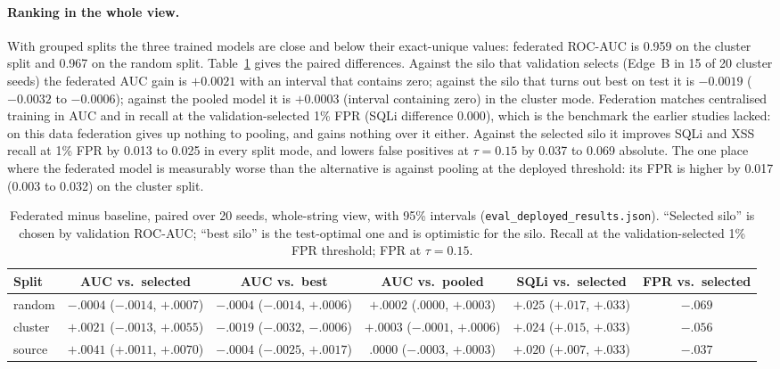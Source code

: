 \paragraph{Ranking in the whole view.}
With grouped splits the three trained models are close and below their exact-unique values: federated ROC-AUC is 0.959 on the cluster split and 0.967 on the random split. Table~\ref{tab:eval-paired} gives the paired differences. Against the silo that validation selects (Edge~B in 15 of 20 cluster seeds) the federated AUC gain is $+0.0021$ with an interval that contains zero; against the silo that turns out best on test it is $-0.0019$ ($-0.0032$ to $-0.0006$); against the pooled model it is $+0.0003$ (interval containing zero) in the cluster mode. Federation matches centralised training in AUC and in recall at the validation-selected 1\% FPR (SQLi difference $0.000$), which is the benchmark the earlier studies lacked: on this data federation gives up nothing to pooling, and gains nothing over it either. Against the selected silo it improves SQLi and XSS recall at 1\% FPR by 0.013 to 0.025 in every split mode, and lowers false positives at $\tau=0.15$ by 0.037 to 0.069 absolute. The one place where the federated model is measurably worse than the alternative is against pooling at the deployed threshold: its FPR is higher by 0.017 (0.003 to 0.032) on the cluster split.

\begin{table}[t]
\centering
\caption{Federated minus baseline, paired over 20 seeds, whole-string view, with 95\% intervals (\texttt{eval\_deployed\_results.json}). ``Selected silo'' is chosen by validation ROC-AUC; ``best silo'' is the test-optimal one and is optimistic for the silo. Recall at the validation-selected 1\% FPR threshold; FPR at $\tau=0.15$.}
\label{tab:eval-paired}
\begin{tabular}{@{}lccccc@{}}
\toprule
\textbf{Split} & \textbf{AUC vs.\ selected} & \textbf{AUC vs.\ best} & \textbf{AUC vs.\ pooled} & \textbf{SQLi vs.\ selected} & \textbf{FPR vs.\ selected} \\ \midrule
random & $-.0004$ ($-.0014$, $+.0007$) & $-.0004$ ($-.0014$, $+.0006$) & $+.0002$ ($.0000$, $+.0003$) & $+.025$ ($+.017$, $+.033$) & $-.069$ \\
cluster & $+.0021$ ($-.0013$, $+.0055$) & $-.0019$ ($-.0032$, $-.0006$) & $+.0003$ ($-.0001$, $+.0006$) & $+.024$ ($+.015$, $+.033$) & $-.056$ \\
source & $+.0041$ ($+.0011$, $+.0070$) & $-.0004$ ($-.0025$, $+.0017$) & $.0000$ ($-.0003$, $+.0003$) & $+.020$ ($+.007$, $+.033$) & $-.037$ \\ \bottomrule
\end{tabular}
\end{table}

